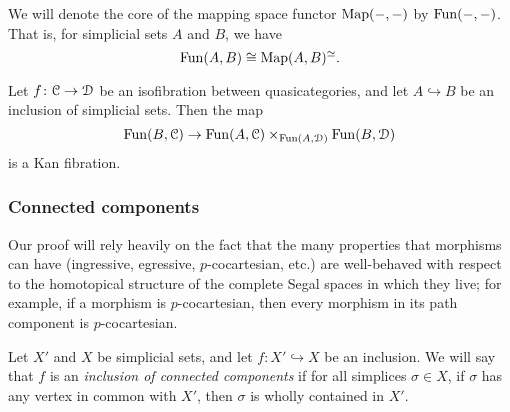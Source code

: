\documentclass[main.tex]{subfiles}
\begin{document}
We will denote the core of the mapping space functor $\mathrm{Map}(-, -)$ by $\mathrm{Fun}(-, -)$. That is, for simplicial sets $A$ and $B$, we have
\begin{equation*}
  \mathrm{Fun}(A, B) \cong \mathrm{Map}(A, B)^{\simeq}.
\end{equation*}

\begin{corollary}
  \label{cor:kan_fib_and_isofib}
  Let $f\colon \mathcal{C} \to \mathcal{D}$ be an isofibration between quasicategories, and let $A \hookrightarrow B$ be an inclusion of simplicial sets. Then the map
  \begin{equation*}
    \mathrm{Fun}(B, \mathcal{C}) \to \mathrm{Fun}(A, \mathcal{C}) \times_{\mathrm{Fun}(A, \mathcal{D})} \mathrm{Fun}(B, \mathcal{D})
  \end{equation*}
  is a Kan fibration.
\end{corollary}

\subsubsection{Connected components}

Our proof will rely heavily on the fact that the many properties that morphisms can have (ingressive, egressive, $p$-cocartesian, etc.) are well-behaved with respect to the homotopical structure of the complete Segal spaces in which they live; for example, if a morphism is $p$-cocartesian, then every morphism in its path component is $p$-cocartesian.

Let $X'$ and $X$ be simplicial sets, and let $f\colon X' \hookrightarrow X$ be an inclusion. We will say that $f$ is an \emph{inclusion of connected components} if for all simplices $\sigma \in X$, if $\sigma$ has any vertex in common with $X'$, then $\sigma$ is wholly contained in $X'$.
\end{document}
